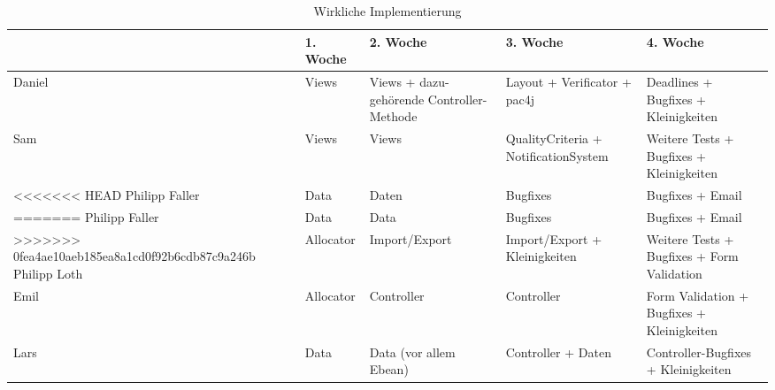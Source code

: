 \documentclass[parskip=full]{scrartcl}
\begin{document}



\begin{table}[H]
\begin{tabularx}{\textwidth}{|l|l|X|X|X|}
\hline
 	& 1. Woche			& 2. Woche		& 3. Woche & 4. Woche\\
\hline 
Daniel	& Views			& Views + dazu-gehörende Controller-Methode & Layout + Verificator
+ pac4j&Deadlines + Bugfixes +
Kleinigkeiten \\
\hline
Sam & Views&Views& QualityCriteria +
NotificationSystem & Weitere Tests +
Bugfixes +
Kleinigkeiten\\
\hline
<<<<<<< HEAD
Philipp Faller&Data&Daten&Bugfixes&Bugfixes +  Email\\
=======
Philipp Faller&Data&Data&Bugfixes&Bugfixes +  Email\\
>>>>>>> 0fea4ae10aeb185ea8a1cd0f92b6cdb87c9a246b
\hline
Philipp Loth&Allocator&Import/Export
&Import/Export + Kleinigkeiten &Weitere Tests +
Bugfixes +
Form Validation\\
\hline
Emil&Allocator&Controller&Controller&Form Validation +
Bugfixes +
Kleinigkeiten\\
\hline
Lars&Data&Data (vor allem
Ebean)&Controller + Daten &
Controller-Bugfixes +
Kleinigkeiten\\
\hline
\end{tabularx}
\caption{Wirkliche Implementierung}
\end{table}
\end{document}
